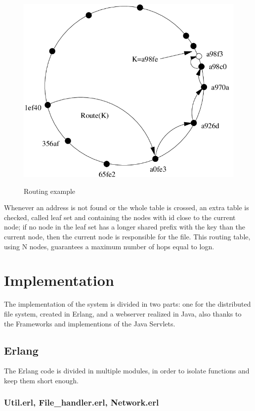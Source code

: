 \documentclass{article}
\begin{document}
\begin{figure}[H]
    \includegraphics[width=12cm, center]{images/pastry_routing.png}
    \label{fig:3unreac}
    \caption{Routing example}
\end{figure}


Whenever an address is not found or the whole table is crossed, an extra table is checked, 
called leaf set and containing the nodes with id close to the current node; 
if no node in the leaf set has a longer shared prefix with the key than the current node, 
then the current node is responsible for the file. 
This routing table, using N nodes, guarantees a maximum number of hops equal to logn.

\section{Implementation}

The implementation of the system is divided in two parts: one for the distributed file system, 
created in Erlang, and a webserver realized in Java, also thanks to the Frameworks and implementions of the Java Servlets.

\subsection{Erlang}

The Erlang code is divided in multiple modules, in order to isolate functions and keep them short enough.

\subsubsection{Util.erl, File\_handler.erl, Network.erl}
\end{document}
